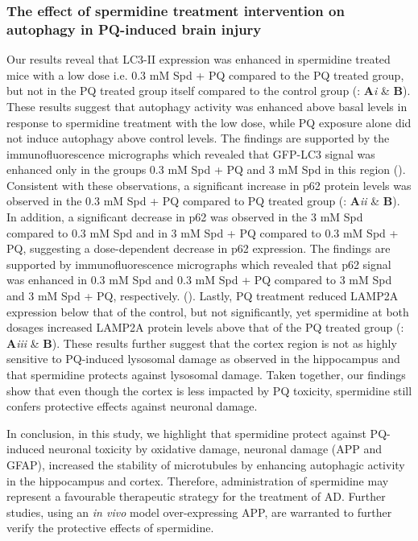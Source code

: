 \subsubsection{The effect of spermidine treatment intervention on autophagy in PQ-induced brain injury}
Our results reveal that LC3-II expression was enhanced in spermidine treated mice with a low dose i.e. 0.3 mM Spd + PQ compared to the PQ treated group, but not in the PQ treated group itself compared to the control group (: \textbf{A}\textit{i} \& \textbf{B}). These results suggest that autophagy activity was enhanced above basal levels in response to spermidine treatment with the low dose, while PQ exposure alone did not induce autophagy above control levels. The findings are supported by the immunofluorescence micrographs which revealed that GFP-LC3 signal was enhanced only in the groups 0.3 mM Spd + PQ and 3 mM Spd in this region (). Consistent with these observations, a significant increase in p62 protein levels was observed in the 0.3 mM Spd + PQ compared to PQ treated group (: \textbf{A}\textit{ii} \& \textbf{B}). In addition, a significant decrease in p62 was observed in the 3 mM Spd compared to 0.3 mM Spd  and in 3 mM Spd + PQ compared to 0.3 mM Spd + PQ, suggesting a dose-dependent decrease in p62 expression. The findings are supported by immunofluorescence micrographs which revealed that p62 signal was enhanced in 0.3 mM Spd and 0.3 mM Spd + PQ compared to 3 mM Spd and 3 mM Spd + PQ, respectively.
(). Lastly, PQ treatment reduced LAMP2A expression below that of the control, but not significantly, yet spermidine at both dosages increased LAMP2A protein levels above that of the PQ treated group (: \textbf{A}\textit{iii} \& \textbf{B}). These results further suggest that the cortex region is not as highly sensitive to PQ-induced lysosomal damage as observed in the hippocampus and that spermidine protects against lysosomal damage. Taken together, our findings show that even though the cortex is less impacted by PQ toxicity, spermidine still confers protective effects against neuronal damage.  

In conclusion, in this study, we highlight that spermidine protect against PQ-induced neuronal toxicity by oxidative damage, neuronal damage (APP and GFAP), increased the stability of microtubules by enhancing autophagic activity in the hippocampus and cortex. Therefore, administration of spermidine may represent a favourable therapeutic strategy for the treatment of AD. Further studies, using an \textit{in vivo} model over-expressing APP, are warranted to further verify the protective effects of spermidine.